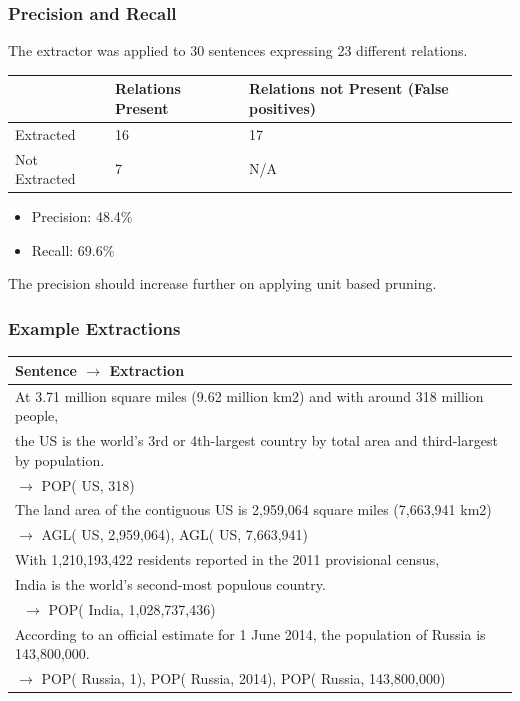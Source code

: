 \documentclass[a4paper,10pt]{article}
\begin{document}
\subsubsection{Precision and Recall}
The extractor was applied to 30 sentences expressing 23 different relations.
\begin{tabular}{|l|l|l|}
\hline
& Relations Present & Relations not Present (False positives) \\
\hline
Extracted & 16 & 17 \\
\hline
Not Extracted & 7 & N/A \\
\hline
\end{tabular}
 \begin{itemize}
  \item Precision: 48.4\%
  \item Recall: 69.6\%
 \end{itemize}

The precision should increase further on applying unit based pruning.

\subsubsection{Example Extractions}
\begin{tabular}{|l|} 
\hline
Sentence $\rightarrow$ Extraction \\
\hline
At 3.71 million square miles (9.62 million km2) and with around 318 million people,\\ 
the US is the world's 3rd or 4th-largest country by total area and third-largest by population. \\$\rightarrow$ POP( US, 318) \\
\hline
The land area of the contiguous US is 2,959,064 square miles (7,663,941 km2)\\ $\rightarrow$  AGL( US, 2,959,064), AGL( US, 7,663,941) \\
\hline
With 1,210,193,422 residents reported in the 2011 provisional census,\\ 
India is the world's second-most populous country.\\\ $\rightarrow$ POP( India, 1,028,737,436)\\ 
\hline
According to an official estimate for 1 June 2014, the population of Russia is 143,800,000.\\ $\rightarrow$
POP( Russia, 1), POP( Russia, 2014), POP( Russia, 143,800,000) \\
\hline
\end{tabular}


\end{document}

